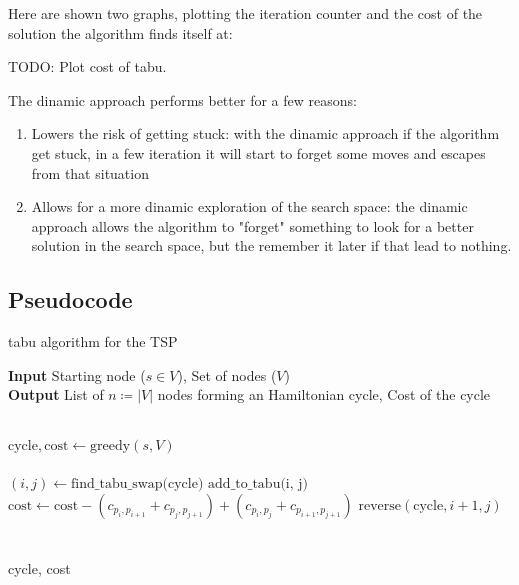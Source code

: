 Here are shown two graphs, plotting the iteration counter and the cost of the solution the algorithm finds itself at:

TODO: Plot cost of tabu.

The dinamic approach performs better for a few reasons:

\begin{enumerate}
    \item Lowers the risk of getting stuck: with the dinamic approach if the algorithm get stuck, in a few iteration it will start to forget some moves and escapes from that situation
    \item Allows for a more dinamic exploration of the search space: the dinamic approach allows the algorithm to "forget" something to look for a better solution in the search space, but the remember it later if that lead to nothing.
\end{enumerate}

\subsection{Pseudocode}

\begin{algorithm}
    \caption{tabu algorithm for the TSP}
    \hspace*{\algorithmicindent} \textbf{Input} Starting node ($s\in V$), Set of nodes ($V$)\\
    \hspace*{\algorithmicindent} \textbf{Output} List of $n\coloneq|V|$ nodes forming an Hamiltonian cycle, Cost of the cycle
    \begin{algorithmic}\\
        
        \State $\mbox{cycle}, \mbox{cost} \gets \mbox{greedy}(s, V)$\\

        \\
            \State $(i, j)\gets \mbox{find\_tabu\_swap(cycle)}$
            \State $\mbox{add\_to\_tabu(i, j)}$
            \State $\mbox{cost}\gets\mbox{cost}-(c_{p_i,p_{i+1}}+c_{p_j,p_{j+1}})+(c_{p_i,p_{j}}+c_{p_{i+1},p_{j+1}})$
            \State $\mbox{reverse}(\mbox{cycle}, i+1, j)$\\

        \EndWhile\\\\

        \Return cycle, cost
    \end{algorithmic}
\end{algorithm}

